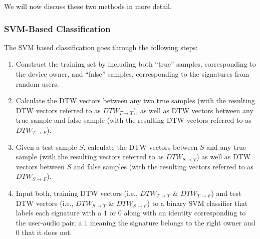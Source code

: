 \iffalse
We will now discuss these two methods in more detail.

\subsubsection{SVM-Based Classification}
The SVM based classification goes through the following steps:
\begin{enumerate}
\item Construct the training set by including both ``true'' samples,
corresponding to the device owner, and ``false'' samples, corresponding to the
signatures from random users.
\item Calculate the DTW vectors between any two true samples (with the
resulting DTW vectors referred to as $DTW_{T\rightarrow T}$), as well as DTW
vectors between any true sample and false sample (with the resulting DTW
vectors referred to as $DTW_{T\rightarrow F}$).
\item Given a test sample $S$, calculate the
DTW vectors between $S$ and any true sample (with the resulting vectors
referred to as $DTW_{S\rightarrow T}$) as well as DTW vectors between $S$ and
false samples (with the resulting vectors referred to as $DTW_{S\rightarrow
F}$).
\item Input both, training DTW vectors (i.e., $DTW_{T\rightarrow T}$ \&
$DTW_{T\rightarrow F}$) and test DTW vectors (i.e., $DTW_{S\rightarrow T}$
\& $DTW_{S\rightarrow F}$) to a binary SVM classifier that labels each
signature with a $1$ or $0$ along with an identity corresponding to the
user-audio pair; a $1$ meaning the signature belongs to the right owner and
$0$ that it does not.
\end{enumerate}

